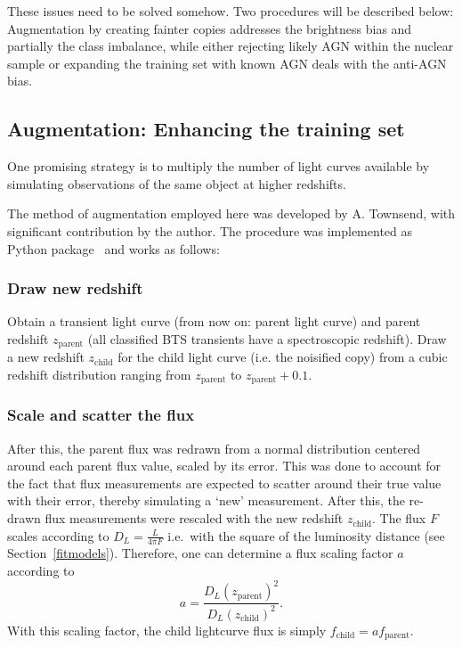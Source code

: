 These issues need to be solved somehow. Two procedures will be described below: Augmentation by creating fainter copies addresses the brightness bias and partially the class imbalance, while either rejecting likely AGN within the nuclear sample or expanding the training set with known AGN deals with the anti-AGN bias.

\subsection{Augmentation: Enhancing the training set}\label{noisification}
One promising strategy is to multiply the number of light curves available by simulating observations of the same object at higher redshifts.

The method of augmentation employed here was developed by A. Townsend, with significant contribution by the author. The procedure was implemented as Python package~ and works as follows:

\subsubsection{Draw new redshift}
Obtain a transient light curve (from now on: parent light curve) and parent redshift $z_\text{parent}$ (all classified BTS transients have a spectroscopic redshift). Draw a new redshift $z_\text{child}$ for the child light curve (i.e. the noisified copy) from a cubic redshift distribution ranging from $z­_\text{parent}$ to $z_\text{parent}+0.1$.

\subsubsection{Scale and scatter the flux}
After this, the parent flux was redrawn from a normal distribution centered around each parent flux value, scaled by its error. This was done to account for the fact that flux measurements are expected to scatter around their true value with their error, thereby simulating a `new' measurement. After this, the re-drawn flux measurements were rescaled with the new redshift $z_\text{child}$. The flux $F$ scales according to $D_L=\frac{L}{4 \pi F}$ i.e.~with the square of the luminosity distance (see Section~\ref{fitmodels}). Therefore, one can determine a flux scaling factor $a$ according to
\begin{equation}
  a = \frac{D_L(z_\text{parent})^2}{D_L(z_\text{child})^2}.
\end{equation}
With this scaling factor, the child lightcurve flux is simply $f_\text{child} = a f_\text{parent}$.

